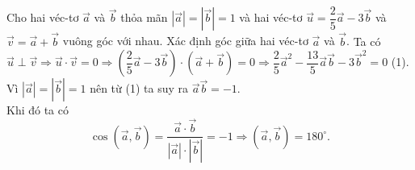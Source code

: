 
\begin{bt}%
	Cho hai véc-tơ $\overrightarrow{a}$ và $\overrightarrow{b}$ thỏa mãn $\left |\overrightarrow{a} \right |=\left |\overrightarrow{b} \right |=1$ và hai véc-tơ $\overrightarrow{u}=\dfrac{2}{5}\overrightarrow{a}-3\overrightarrow{b}$ và $\overrightarrow{v}=\overrightarrow{a}+\overrightarrow{b}$ vuông góc với nhau. Xác định góc giữa hai véc-tơ $\overrightarrow{a}$ và $\overrightarrow{b}$.
	\loigiai
	{
	Ta có $\overrightarrow{u}\perp\overrightarrow{v}\Rightarrow\overrightarrow{u}\cdot\overrightarrow{v}=0\Rightarrow\left (\dfrac{2}{5}\overrightarrow{a}-3\overrightarrow{b} \right )\cdot\left (\overrightarrow{a}+\overrightarrow{b} \right )=0\Rightarrow \dfrac{2}{5}\overrightarrow{a}^2-\dfrac{13}{5}\overrightarrow{a}\overrightarrow{b}-3\overrightarrow{b}^2=0$ (1).\\
	Vì $\left |\overrightarrow{a} \right |=\left |\overrightarrow{b} \right |=1$ nên từ (1) ta suy ra $\overrightarrow{a}\overrightarrow{b}=-1$.\\
	Khi đó ta có $$\cos\left (\overrightarrow{a},\overrightarrow{b} \right )=\dfrac{\overrightarrow{a}\cdot\overrightarrow{b}}{\left |\overrightarrow{a} \right |\cdot\left |\overrightarrow{b} \right |}=-1\Rightarrow\left (\overrightarrow{a},\overrightarrow{b} \right )=180^{\circ}.$$
	}
\end{bt}

